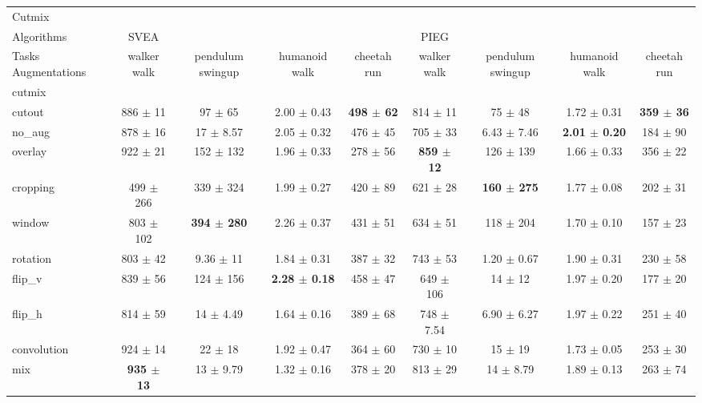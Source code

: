 \begin{tabular}{lcccccccc}
Cutmix & & & & & & & & \\
Algorithms & SVEA & & & & PIEG & & & \\
Tasks Augmentations & walker walk & pendulum swingup & humanoid walk & cheetah run & walker walk & pendulum swingup & humanoid walk & cheetah run \\
cutmix          &  &  &  &  &  &  &  &  \\
cutout          & 886 $\pm$ 11 & 97 $\pm$ 65 & 2.00 $\pm$ 0.43 & \textbf{498 $\pm$ 62} & 814 $\pm$ 11 & 75 $\pm$ 48 & 1.72 $\pm$ 0.31 & \textbf{359 $\pm$ 36} \\
no\_aug         & 878 $\pm$ 16 & 17 $\pm$ 8.57 & 2.05 $\pm$ 0.32 & 476 $\pm$ 45 & 705 $\pm$ 33 & 6.43 $\pm$ 7.46 & \textbf{2.01 $\pm$ 0.20} & 184 $\pm$ 90 \\
overlay         & 922 $\pm$ 21 & 152 $\pm$ 132 & 1.96 $\pm$ 0.33 & 278 $\pm$ 56 & \textbf{859 $\pm$ 12} & 126 $\pm$ 139 & 1.66 $\pm$ 0.33 & 356 $\pm$ 22 \\
cropping        & 499 $\pm$ 266 & 339 $\pm$ 324 & 1.99 $\pm$ 0.27 & 420 $\pm$ 89 & 621 $\pm$ 28 & \textbf{160 $\pm$ 275} & 1.77 $\pm$ 0.08 & 202 $\pm$ 31 \\
window          & 803 $\pm$ 102 & \textbf{394 $\pm$ 280} & 2.26 $\pm$ 0.37 & 431 $\pm$ 51 & 634 $\pm$ 51 & 118 $\pm$ 204 & 1.70 $\pm$ 0.10 & 157 $\pm$ 23 \\
rotation        & 803 $\pm$ 42 & 9.36 $\pm$ 11 & 1.84 $\pm$ 0.31 & 387 $\pm$ 32 & 743 $\pm$ 53 & 1.20 $\pm$ 0.67 & 1.90 $\pm$ 0.31 & 230 $\pm$ 58 \\
flip\_v         & 839 $\pm$ 56 & 124 $\pm$ 156 & \textbf{2.28 $\pm$ 0.18} & 458 $\pm$ 47 & 649 $\pm$ 106 & 14 $\pm$ 12 & 1.97 $\pm$ 0.20 & 177 $\pm$ 20 \\
flip\_h         & 814 $\pm$ 59 & 14 $\pm$ 4.49 & 1.64 $\pm$ 0.16 & 389 $\pm$ 68 & 748 $\pm$ 7.54 & 6.90 $\pm$ 6.27 & 1.97 $\pm$ 0.22 & 251 $\pm$ 40 \\
convolution     & 924 $\pm$ 14 & 22 $\pm$ 18 & 1.92 $\pm$ 0.47 & 364 $\pm$ 60 & 730 $\pm$ 10 & 15 $\pm$ 19 & 1.73 $\pm$ 0.05 & 253 $\pm$ 30 \\
mix             & \textbf{935 $\pm$ 13} & 13 $\pm$ 9.79 & 1.32 $\pm$ 0.16 & 378 $\pm$ 20 & 813 $\pm$ 29 & 14 $\pm$ 8.79 & 1.89 $\pm$ 0.13 & 263 $\pm$ 74 \\
\end{tabular}